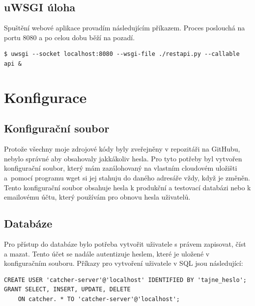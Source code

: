 


\subsection*{uWSGI úloha}

\indent

Spuštění webové aplikace provadím následujícím příkazem. Proces poslouchá na portu 8080 a po celou dobu běží na pozadí.

\begingroup
\fontsize{9.5pt}{11pt}\selectfont
\begin{verbatim}
$ uwsgi --socket localhost:8080 --wsgi-file ./restapi.py --callable api &
\end{verbatim}
\endgroup

\section{Konfigurace}

\subsection*{Konfigurační soubor}

\indent

Protože všechny moje zdrojové kódy byly zveřejněny v repozitáři na GitHubu, nebylo správné aby obsahovaly jakkákoliv hesla.
Pro tyto potřeby byl vytvořen konfigurační soubor, který mám zazálohovaný na vlastním cloudovém uložišti
a~pomocí programu wget si jej stahuju do daného adresáře vždy, když je změněn.
Tento konfigurační soubor obsahuje hesla k produkční a testovací databázi
nebo k emailovému účtu, který používám pro obnovu hesla uživatelů.

\subsection*{Databáze}

\indent

Pro přístup do databáze bylo potřeba vytvořit uživatele s právem zapisovat, číst a mazat.
Tento účet se nadále autentizuje heslem, které je uložené v konfiguračním souboru.
Příkazy pro vytvoření uživatele v SQL jsou následující:

\begingroup
\fontsize{9.5pt}{11pt}\selectfont
\begin{verbatim}
CREATE USER 'catcher-server'@'localhost' IDENTIFIED BY 'tajne_heslo';
GRANT SELECT, INSERT, UPDATE, DELETE
    ON catcher. * TO 'catcher-server'@'localhost';
\end{verbatim}
\endgroup

